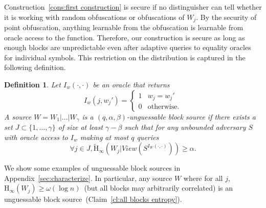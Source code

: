 \documentclass[11pt]{article}
\newcommand{\apref}[1]{\mbox{Appendix~\ref{#1}}}
\newcommand{\clref}[1]{\mbox{Claim~\ref{#1}}}
\newcommand{\consref}[1]{\mbox{Construction~\ref{#1}}}
\newcommand{\Hoo}{\mathrm{H}_\infty}
\newcommand{\Hav}{\tilde{\mathrm{H}}_\infty}
\newtheorem{definition}[theorem]{Definition}
\begin{document}
\consref{cons:first construction} is secure if no distinguisher can tell whether it is working with random obfuscations or obfuscations of $W_j$.  By the security of point obfuscation, anything learnable from the obfuscation is learnable from oracle access to the function. Therefore, our construction is secure as long as enough blocks are unpredictable even after adaptive queries to equality oracles for individual symbols. This restriction on the distribution is captured in the following definition.

\begin{definition}
\label{def:block guessable}
Let $I_w (\cdot, \cdot)$ be an oracle that returns \[I_w(j, w_j')=
\begin{cases}
1 & w_j = w_j'\\
0 & \text{otherwise}.
\end{cases}
\]
A source $W = W_1| ... |W_\gamma$ is a $(q, \alpha, \beta)$-\emph{unguessable block source} if there exists a set $J\subset\{1,..., \gamma\}$ of size at least $\gamma -\beta$ such that for any unbounded adversary $S$ with oracle access to $I_w$ making at most $q$ queries
\[
\forall j\in J, \Hav(W_j |View(S^{I_{W}(\cdot, \cdot)}))\geq \alpha.
\]
\end{definition}

We show some examples of unguessable block sources in \apref{sec:characterize}.  In particular, any source $W$ where for all $j$, $\Hoo(W_j) \geq \omega(\log n)$~(but all blocks may arbitrarily correlated) is an unguessable block source~(\clref{cl:all blocks entropy}).
\end{document}
